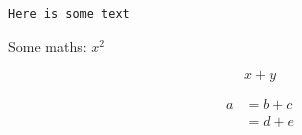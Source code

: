 \documentclass[12pt]{article}
\begin{document}
\begin{verbatim}
Here is some text
\end{verbatim}

Some maths: \(x^2\)

\begin{equation}
x + y
\end{equation}

\begin{align}
a &= b + c \\
&= d + e
\end{align}
\end{document}
